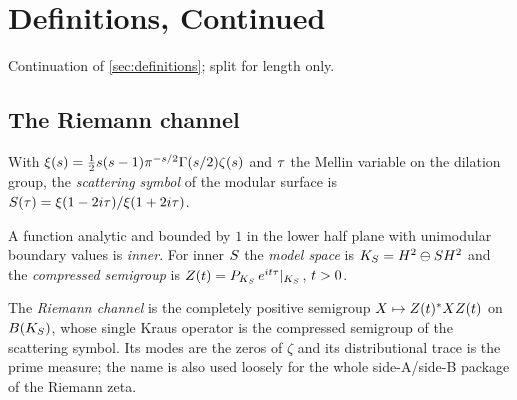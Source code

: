 
\section{Definitions, Continued}
\label{sec:definitions-b}

Continuation of \cref{sec:definitions}; split for length only.

\subsection{The Riemann channel}

\begin{definition}
\label{def:scattering-symbol}
With $\xi(s) = \frac12 s(s-1)\pi^{-s/2}\Gamma(s/2)\zeta(s)$ and $\tau$ the
Mellin variable on the dilation group, the \emph{scattering symbol} of the
modular surface is $S(\tau) = \xi(1-2i\tau)/\xi(1+2i\tau)$.
\end{definition}

\begin{definition}
\label{def:inner-model-space}
A function analytic and bounded by $1$ in the lower half plane with
unimodular boundary values is \emph{inner}. For inner $S$ the
\emph{model space} is $K_S = H^2\ominus S H^2$ and the \emph{compressed
semigroup} is $Z(t) = P_{K_S}\,e^{it\tau}|_{K_S}$, $t>0$.
\end{definition}

\begin{definition}
\label{def:riemann-channel}
The \emph{Riemann channel} is the completely positive semigroup
$X\mapsto Z(t)^{*}XZ(t)$ on $B(K_S)$, whose single Kraus operator is the
compressed semigroup of the scattering symbol. Its modes are the zeros of
$\zeta$ and its distributional trace is the prime measure; the name is also
used loosely for the whole side-A/side-B package of the Riemann zeta.
\end{definition}

